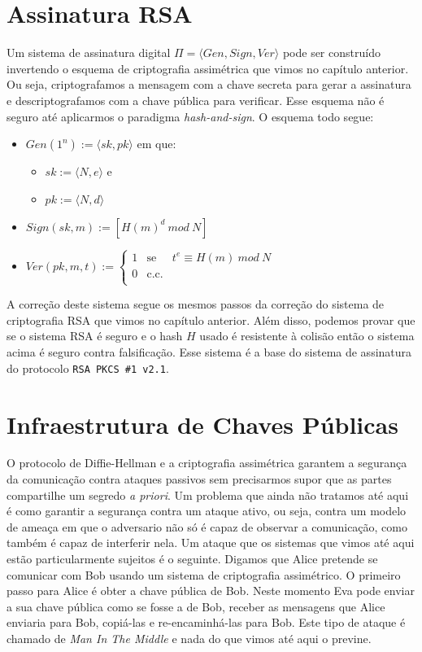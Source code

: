 \section{Assinatura RSA}
\label{sec:assinatura-rsa}

Um sistema de assinatura digital $\Pi = \langle Gen, Sign, Ver \rangle$ pode ser construído invertendo o esquema de criptografia assimétrica que vimos no capítulo anterior.
Ou seja, criptografamos a mensagem com a chave secreta para gerar a assinatura e descriptografamos com a chave pública para verificar.
Esse esquema não é seguro até aplicarmos o paradigma {\em hash-and-sign}.
O esquema todo segue:
\begin{itemize}
\item $Gen(1^n) := \langle sk, pk \rangle$ em que:
\begin{itemize}
\item $sk := \langle N, e \rangle$ e
\item $pk := \langle N, d \rangle$
\end{itemize}
\item $Sign(sk, m) := [H(m)^d\ mod\ N]$
\item $Ver(pk, m, t) := \left\{
    \begin{array}{lcl}
      1 & \textrm{se} & t^e \equiv H(m)\ mod\ N\\
      0 & \textrm{c.c.} &\\
    \end{array}
    \right.$
\end{itemize}

A correção deste sistema segue os mesmos passos da correção do sistema de criptografia RSA que vimos no capítulo anterior.
Além disso, podemos provar que se o sistema RSA é seguro e o hash $H$ usado é resistente à colisão então o sistema acima é seguro contra falsificação.
Esse sistema é a base do sistema de assinatura do protocolo {\tt RSA PKCS \#1 v2.1}.

\section{Infraestrutura de Chaves Públicas}
\label{sec:pki}

O protocolo de Diffie-Hellman e a criptografia assimétrica garantem a segurança da comunicação contra ataques passivos sem precisarmos supor que as partes compartilhe um segredo {\em a priori}.
Um problema que ainda não tratamos até aqui é como garantir a segurança contra um ataque ativo, ou seja, contra um modelo de ameaça em que o adversario não só é capaz de observar a comunicação, como também é capaz de interferir nela.
Um ataque que os sistemas que vimos até aqui estão particularmente sujeitos é o seguinte.
Digamos que Alice pretende se comunicar com Bob usando um sistema de criptografia assimétrico.
O primeiro passo para Alice é obter a chave pública de Bob.
Neste momento Eva pode enviar a sua chave pública como se fosse a de Bob, receber as mensagens que Alice enviaria para Bob, copiá-las e re-encaminhá-las para Bob.
Este tipo de ataque é chamado de {\em Man In The Middle} e nada do que vimos até aqui o previne.

